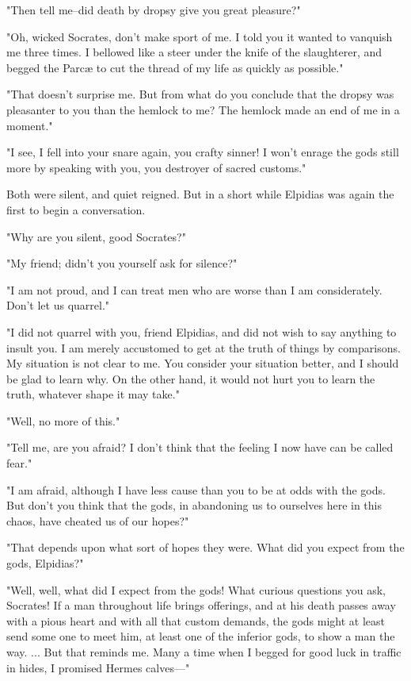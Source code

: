 "Then tell me--did death by dropsy give you great pleasure?"

"Oh, wicked Socrates, don't make sport of me. I told you it wanted to
vanquish me three times. I bellowed like a steer under the knife of
the slaughterer, and begged the Parcæ to cut the thread of my life as
quickly as possible."

"That doesn't surprise me. But from what do you conclude that the
dropsy was pleasanter to you than the hemlock to me? The hemlock made
an end of me in a moment."

"I see, I fell into your snare again, you crafty sinner! I won't
enrage the gods still more by speaking with you, you destroyer of
sacred customs."

Both were silent, and quiet reigned. But in a short while Elpidias was
again the first to begin a conversation.

"Why are you silent, good Socrates?"

"My friend; didn't you yourself ask for silence?"

"I am not proud, and I can treat men who are worse than I am
considerately. Don't let us quarrel."

"I did not quarrel with you, friend Elpidias, and did not wish to say
anything to insult you. I am merely accustomed to get at the truth of
things by comparisons. My situation is not clear to me. You consider
your situation better, and I should be glad to learn why. On the other
hand, it would not hurt you to learn the truth, whatever shape it may
take."

"Well, no more of this."

"Tell me, are you afraid? I don't think that the feeling I now have
can be called fear."

"I am afraid, although I have less cause than you to be at odds with
the gods. But don't you think that the gods, in abandoning us to
ourselves here in this chaos, have cheated us of our hopes?"

"That depends upon what sort of hopes they were. What did you expect
from the gods, Elpidias?"

"Well, well, what did I expect from the gods! What curious questions
you ask, Socrates! If a man throughout life brings offerings, and at
his death passes away with a pious heart and with all that custom
demands, the gods might at least send some one to meet him, at least
one of the inferior gods, to show a man the way. ... But that reminds
me. Many a time when I begged for good luck in traffic in hides, I
promised Hermes calves---"


